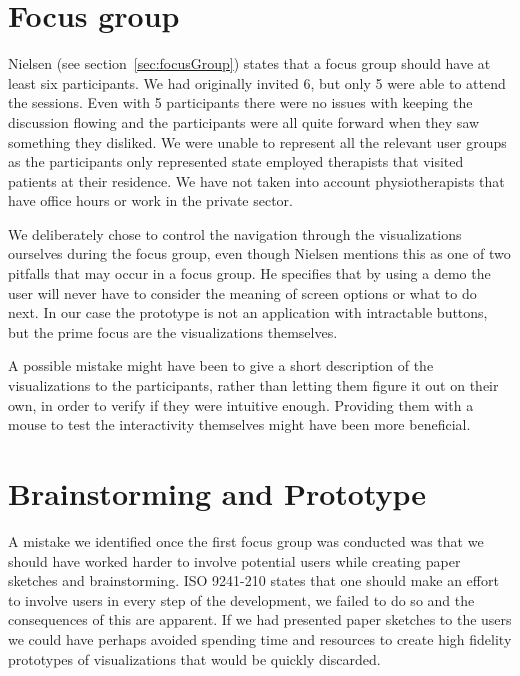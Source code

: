 \section{Focus group}
Nielsen (see section~\ref{sec:focusGroup}) states that a focus group should have at least six participants. We had originally invited 6, but only 5 were able to attend the sessions. Even with 5 participants there were no issues with keeping the discussion flowing and the participants were all quite forward when they saw something they disliked. We were unable to represent all the relevant user groups as the participants only represented state employed therapists that visited patients at their residence. We have not taken into account physiotherapists that have office hours or work in the private sector.

We deliberately chose to control the navigation through the visualizations ourselves during the focus group, even though Nielsen mentions this as one of two pitfalls that may occur in a focus group. He specifies that by using a demo the user will never have to consider the meaning of screen options or what to do next. In our case the prototype is not an application with intractable buttons, but the prime focus are the visualizations themselves. 

A possible mistake might have been to give a short description of the visualizations to the participants, rather than letting them figure it out on their own, in order to verify if they were intuitive enough. Providing them with a mouse to test the interactivity themselves might have been more beneficial.

\section{Brainstorming and Prototype}
A mistake we identified once the first focus group was conducted was that we should have worked harder to involve potential users while creating paper sketches and brainstorming. ISO 9241-210 states that one should make an effort to involve users in every step of the development, we failed to do so and the consequences of this are apparent. If we had presented paper sketches to the users we could have perhaps avoided spending time and resources to create high fidelity prototypes of visualizations that would be quickly discarded.
